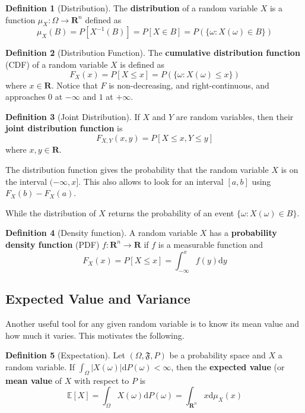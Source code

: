 \documentclass[12pt,a4paper]{article}
\theoremstyle{definition}
\newtheorem{definition}{Definition}[section]
\begin{document}
\begin{definition}[Distribution]
	The \textbf{distribution} of a random variable $X$ is a function $\mu_X : \Omega \longrightarrow \textbf{R}^n$ defined as
	\[
		\mu_X(B) = P [X^{-1}(B)] = P[X \in B] = P(\{ \omega : X(\omega) \in B \})
	\]
\end{definition}

\begin{definition}[Distribution Function]
	The \textbf{cumulative distribution function} (CDF) of a random variable $X$ is defined as
	\[
		F_X(x) = P [X \leq x] = P(\{ \omega : X(\omega) \leq x \})
	\]
	where $x \in \textbf{R}$. Notice that $F$ is non-decreasing, and right-continuous, and approaches $0$ at $- \infty$ and $1$ at $+\infty$.
\end{definition}

\begin{definition}[Joint Distribution]
	If $X$ and $Y$ are random variables, then their \textbf{joint distribution function} is
	\[
		F_{X,Y}(x,y) = P [X \leq x, Y \leq y]
	\]
	where $x,y \in \textbf{R}$.
\end{definition}

The distribution function gives the probability that the random variable $X$ is on the interval $(-\infty, x]$. This also allows to look for an interval $[a,b]$ using $F_X(b) - F_X(a)$.

While the distribution of $X$ returns the probability of an event $\{ \omega : X(\omega) \in B\}$.

\begin{definition}[Density function]
	A random variable $X$ has a \textbf{probability density function} (PDF) $f : \textbf{R}^n \longrightarrow \textbf{R}$ if $f$ is a measurable function and \[ F_X(x) = P[X \leq x] = \int_{-\infty}^x f(y) \mathrm{d}y \]
\end{definition}

\subsection{Expected Value and Variance}

Another useful tool for any given random variable is to know its mean value and how much it varies. This motivates the following.

\begin{definition}[Expectation]
	Let $(\Omega, \mathfrak{F}, P)$ be a probability space and $X$ a random variable. If $\int_{\Omega} |X(\omega)|\mathrm{d}P(\omega) < \infty$, then the \textbf{expected value} (or \textbf{mean value} of $X$ with respect to $P$ is
	\[
		\mathbb{E}[X] = \int_{\Omega} X(\omega) \mathrm{d}P(\omega) = \int_{\textbf{R}^n} x \mathrm{d}\mu_X(x)
	\]
\end{definition}
\end{document}
